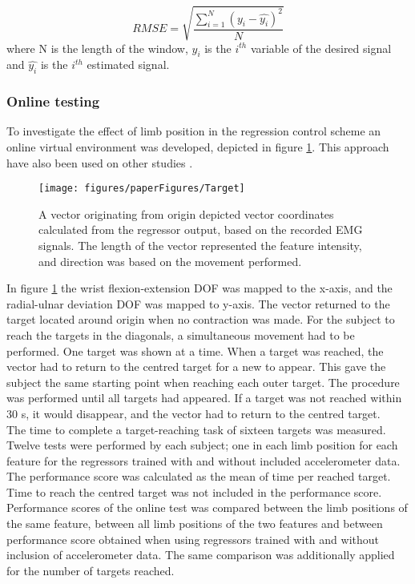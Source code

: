 \begin{multicols}{2}
\begin{equation} \label{eq:rmse}
RMSE = \sqrt{\frac{\sum\limits_{i=1}^N(y_i - \hat{y_i})^2}{N}}
\end{equation}
where N is the length of the window, $y_i$ is the $i^{th}$ variable of the desired signal and $\hat{y_i}$ is the $i^{th}$ estimated signal.

\subsubsection*{Online testing}
To investigate the effect of limb position in the regression control scheme an online virtual environment was developed, depicted in figure \ref{fig:targets}. This approach have also been used on other studies \cite{hahne2014, Hwang2017}.

\begin{figure}[H]
	\centering
	\texttt{[image: figures/paperFigures/Target]}
	\caption{A vector originating from origin depicted vector coordinates calculated from the regressor output, based on the recorded EMG signals. The length of the vector represented the feature intensity, and direction was based on the movement performed.}
	\label{fig:targets}
\end{figure}

In figure \ref{fig:targets} the wrist flexion-extension DOF was mapped to the x-axis, and the radial-ulnar deviation DOF was mapped to y-axis. The vector returned to the target located around origin when no contraction was made. For the subject to reach the targets in the diagonals, a simultaneous movement had to be performed. One target was shown at a time. When a target was reached, the vector had to return to the centred target for a new to appear. This gave the subject the same starting point when reaching each outer target. The procedure was performed until all targets had appeared. If a target was not reached within 30 s, it would disappear, and the vector had to return to the centred target. \\
The time to complete a target-reaching task of sixteen targets was measured. Twelve tests were performed by each subject; one in each limb position for each feature for the regressors trained with and without included accelerometer data. The performance score was calculated as the mean of time per reached target. Time to reach the centred target was not included in the performance score. Performance scores of the online test was compared between the limb positions of the same feature, between all limb positions of the two features and between performance score obtained when using regressors trained with and without inclusion of accelerometer data. The same comparison was additionally applied for the number of targets reached.


\end{multicols}
